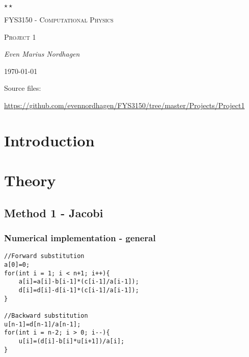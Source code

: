 \documentclass{scrartcl}
\begin{document}
\begin{titlepage}
	\centering
	{\scshape\LARGE $\star\star$  \par}
	\vspace{4cm}
	{\scshape\huge FYS3150 - Computational Physics  \par}
	\vspace{1cm}
	{\scshape\Large Project 1\par}
	\vspace{2cm}
	{\Large\itshape Even Marius Nordhagen\par}
	\vfill
	{\large \today\par}
\end{titlepage}
\newpage
\begin{abstract}
\subsection*{Abstract}
In this project we are finding...
\end{abstract}%

\par Source files:
\par \url{https://github.com/evennordhagen/FYS3150/tree/master/Projects/Project1}

\section{Introduction}

\section{Theory}
		
\subsection{Method 1 - Jacobi}

\subsubsection{Numerical implementation - general}

\begin{lstlisting}
//Forward substitution
a[0]=0;
for(int i = 1; i < n+1; i++){
    a[i]=a[i]-b[i-1]*(c[i-1]/a[i-1]);
    d[i]=d[i]-d[i-1]*(c[i-1]/a[i-1]);
}

//Backward substitution
u[n-1]=d[n-1]/a[n-1];
for(int i = n-2; i > 0; i--){
    u[i]=(d[i]-b[i]*u[i+1])/a[i];
}
\end{lstlisting}
\end{document}

